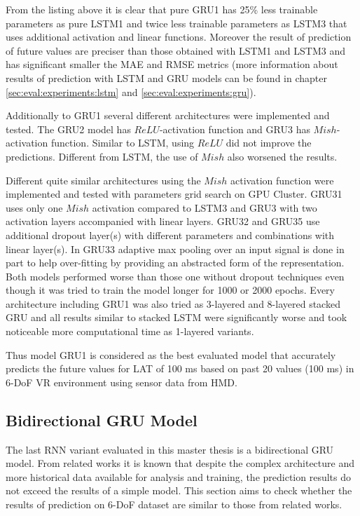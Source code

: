 From the listing above it is clear that pure GRU1 has 25\% less trainable parameters as pure LSTM1 and twice less trainable parameters as LSTM3 that uses additional activation and linear functions. Moreover the result of prediction of future values are preciser than those obtained with LSTM1 and LSTM3 and has significant smaller the MAE and RMSE metrics (more information about results of prediction with LSTM and GRU models can be found in chapter \ref{sec:eval:experiments:lstm} and \ref{sec:eval:experiments:gru}). 

Additionally to GRU1 several different architectures were implemented and tested. The GRU2 model has $ReLU$-activation function and GRU3 has $Mish$-activation function. Similar to LSTM, using $ReLU$ did not improve the predictions. Different from LSTM, the use of $Mish$ also worsened the results.     

Different quite similar architectures using the $Mish$ activation function were implemented and tested with parameters grid search on GPU Cluster. GRU31 uses only one $Mish$ activation compared to LSTM3 and GRU3 with two activation layers accompanied with linear layers. GRU32 and GRU35 use additional dropout layer(s) with different parameters and combinations with linear layer(s). In GRU33 adaptive max pooling over an input signal is done in part to help over-fitting by providing an abstracted form of the representation. Both models performed worse than those one without dropout techniques even though it was tried to train the model longer for 1000 or 2000 epochs. Every architecture including GRU1 was also tried as 3-layered and 8-layered stacked GRU and all results similar to stacked LSTM were significantly worse and took noticeable more computational time as 1-layered variants.

Thus model GRU1 is considered as the best evaluated model that accurately predicts the future values for LAT of 100 ms based on past 20 values (100 ms) in 6-DoF VR environment using sensor data from HMD.

\subsection{Bidirectional GRU Model}
\label{sec:impl:model:arch:bi-gru}
The last RNN variant evaluated in this master thesis is a bidirectional GRU model. From related works it is known that despite the complex architecture and more historical data available for analysis and training, the prediction results do not exceed the results of a simple model. This section aims to check whether the results of prediction on 6-DoF dataset are similar to those from related works.


